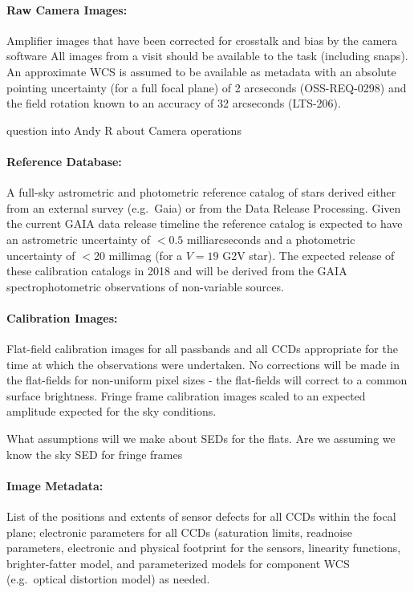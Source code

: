 \paragraph*{Raw Camera Images:} Amplifier images that have been corrected for crosstalk and bias by the camera software All images from a visit should be available to the task (including snaps). An approximate WCS is assumed to be available as metadata with an absolute pointing uncertainty (for a full focal plane) of 2 arcseconds (OSS-REQ-0298) and the field rotation known to an accuracy of 32 arcseconds (LTS-206).
\begin{note}
question into Andy R about Camera operations
\end{note}


\paragraph*{Reference Database:} A full-sky astrometric and photometric reference catalog of stars derived either from an external survey (e.g.\ Gaia) or from the Data Release Processing. Given the current GAIA data release timeline the reference catalog is expected to have an astrometric uncertainty of $<0.5$ milliarcseconds and a photometric uncertainty of $<$20 millimag (for a $V=19$ G2V star). The expected release of these calibration catalogs in 2018 and will be derived from the GAIA spectrophotometric observations of non-variable sources.

\paragraph*{Calibration Images:} Flat-field calibration images for all passbands and all CCDs appropriate for the time at which the observations were undertaken. No corrections will be made in the flat-fields for non-uniform pixel sizes - the flat-fields will correct to a common  surface brightness. Fringe frame calibration images scaled to an expected amplitude expected for the sky conditions.
\begin{note} What assumptions will we make about SEDs for the flats. Are we assuming we know the sky SED for fringe frames \end{note}

\paragraph*{Image Metadata:} List of the positions and extents of sensor defects for all CCDs within the focal plane; electronic parameters for all CCDs (saturation limits, readnoise parameters, electronic and physical footprint for the sensors, linearity functions, brighter-fatter model, and parameterized models for component WCS (e.g.\ optical distortion model) as needed.

